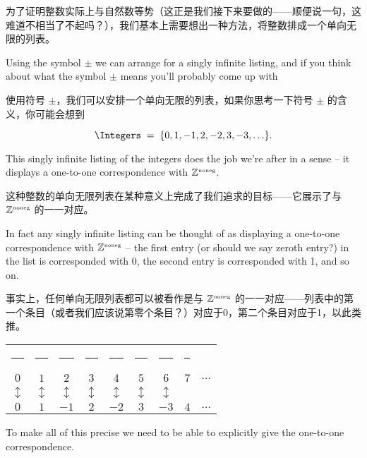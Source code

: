 \noindent 为了证明整数实际上与自然数等势（这正是我们接下来要做的——顺便说一句，这难道不相当了不起吗？），我们基本上需要想出一种方法，将整数排成一个单向无限的列表。

Using the symbol $\pm$ we can arrange for a singly infinite
listing, and if you think about what the symbol $\pm$ means you'll probably
come up with

使用符号 $\pm$，我们可以安排一个单向无限的列表，如果你思考一下符号 $\pm$ 的含义，你可能会想到

\[ \Integers \;
    = \; \{0, 1, -1, 2, -2, 3, -3, \ldots \}.
\]

\noindent This singly infinite listing of the integers does the job
we're after in a sense
-- it displays a one-to-one correspondence with ${\mathbb Z}^{\mbox{\tiny noneg}}$.

\noindent 这种整数的单向无限列表在某种意义上完成了我们追求的目标——它展示了与 ${\mathbb Z}^{\mbox{\tiny noneg}}$ 的一一对应。

In fact
any singly infinite listing can be thought of as displaying a one-to-one correspondence with ${\mathbb Z}^{\mbox{\tiny noneg}}$
-- the first entry (or should we say zeroth entry?) in the list is corresponded
with 0, the second entry is corresponded with 1, and so on.

事实上，任何单向无限列表都可以被看作是与 ${\mathbb Z}^{\mbox{\tiny noneg}}$ 的一一对应——列表中的第一个条目（或者我们应该说第零个条目？）对应于0，第二个条目对应于1，以此类推。

\medskip

\begin{tabular}{ccccccccc}
    \rule{32pt}{0pt} & \rule{32pt}{0pt} & \rule{32pt}{0pt} & \rule{32pt}{0pt} & \rule{32pt}{0pt} & \rule{32pt}{0pt} & \rule{32pt}{0pt} & \rule{32pt}{0pt}            \\
    $0$              & $1$              & $2$              & $3$              & $4$              & $5$              & $6$              & $7$              & $\ldots$ \\
    $\updownarrow$   & $\updownarrow$   & $\updownarrow$   & $\updownarrow$   & $\updownarrow$   & $\updownarrow$   & $\updownarrow$   &                             \\
    $0$              & $1$              & $-1$             & $2$              & $-2$             & $3$              & $-3$             & $4$              & $\ldots$ \\
\end{tabular}
\medskip

To make all of this precise we need to be able to explicitly give the
one-to-one correspondence.

